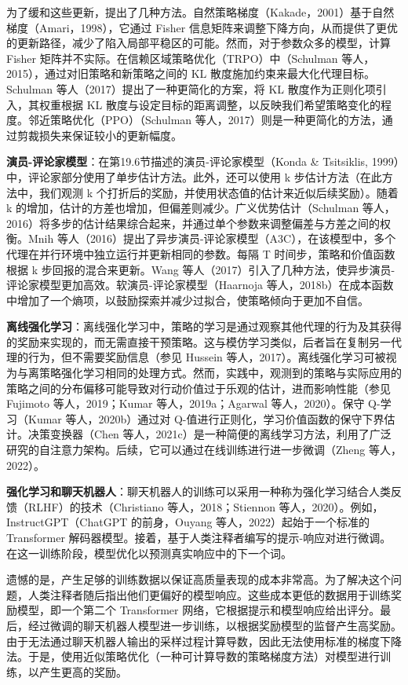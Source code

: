 \documentclass[lang=cn,newtx,10pt,scheme=chinese]{elegantbook}
\begin{document}
为了缓和这些更新，提出了几种方法。自然策略梯度（Kakade，2001）基于自然梯度（Amari，1998），它通过 Fisher 信息矩阵来调整下降方向，从而提供了更优的更新路径，减少了陷入局部平稳区的可能。然而，对于参数众多的模型，计算 Fisher 矩阵并不实际。在信赖区域策略优化（TRPO）中（Schulman 等人，2015），通过对旧策略和新策略之间的 KL 散度施加约束来最大化代理目标。Schulman 等人（2017）提出了一种更简化的方案，将 KL 散度作为正则化项引入，其权重根据 KL 散度与设定目标的距离调整，以反映我们希望策略变化的程度。邻近策略优化（PPO）（Schulman 等人，2017）则是一种更简化的方法，通过剪裁损失来保证较小的更新幅度。

\textbf{演员-评论家模型}：在第19.6节描述的演员-评论家模型（Konda \& Tsitsiklis, 1999）中，评论家部分使用了单步估计方法。此外，还可以使用 k 步估计方法（在此方法中，我们观测 k 个打折后的奖励，并使用状态值的估计来近似后续奖励）。随着 k 的增加，估计的方差也增加，但偏差则减少。广义优势估计（Schulman 等人，2016）将多步的估计结果综合起来，并通过单个参数来调整偏差与方差之间的权衡。Mnih 等人（2016）提出了异步演员-评论家模型（A3C），在该模型中，多个代理在并行环境中独立运行并更新相同的参数。每隔 T 时间步，策略和价值函数根据 k 步回报的混合来更新。Wang 等人（2017）引入了几种方法，使异步演员-评论家模型更加高效。软演员-评论家模型（Haarnoja 等人，2018b）在成本函数中增加了一个熵项，以鼓励探索并减少过拟合，使策略倾向于更加不自信。

\textbf{离线强化学习}：离线强化学习中，策略的学习是通过观察其他代理的行为及其获得的奖励来实现的，而无需直接干预策略。这与模仿学习类似，后者旨在复制另一代理的行为，但不需要奖励信息（参见 Hussein 等人，2017）。离线强化学习可被视为与离策略强化学习相同的处理方式。然而，实践中，观测到的策略与实际应用的策略之间的分布偏移可能导致对行动价值过于乐观的估计，进而影响性能（参见 Fujimoto 等人，2019；Kumar 等人，2019a；Agarwal 等人，2020）。保守 Q-学习（Kumar 等人，2020b）通过对 Q-值进行正则化，学习价值函数的保守下界估计。决策变换器（Chen 等人，2021c）是一种简便的离线学习方法，利用了广泛研究的自注意力架构。后续，它可以通过在线训练进行进一步微调（Zheng 等人，2022）。

\textbf{强化学习和聊天机器人}：聊天机器人的训练可以采用一种称为强化学习结合人类反馈（RLHF）的技术（Christiano 等人，2018；Stiennon 等人，2020）。例如，InstructGPT（ChatGPT 的前身，Ouyang 等人，2022）起始于一个标准的 Transformer 解码器模型。接着，基于人类注释者编写的提示-响应对进行微调。在这一训练阶段，模型优化以预测真实响应中的下一个词。

遗憾的是，产生足够的训练数据以保证高质量表现的成本非常高。为了解决这个问题，人类注释者随后指出他们更偏好的模型响应。这些成本更低的数据用于训练奖励模型，即一个第二个 Transformer 网络，它根据提示和模型响应给出评分。最后，经过微调的聊天机器人模型进一步训练，以根据奖励模型的监督产生高奖励。由于无法通过聊天机器人输出的采样过程计算导数，因此无法使用标准的梯度下降法。于是，使用近似策略优化（一种可计算导数的策略梯度方法）对模型进行训练，以产生更高的奖励。
\end{document}
